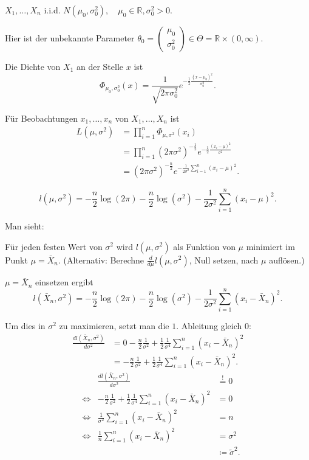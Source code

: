 \documentclass{tstextbook}
\newcommand{\R}{\mathbb R}
\begin{document}
\begin{example}
	$ X_1,\ldots,X_n $ i.i.d. $ N(\mu_0,\sigma_0^2), \quad \mu_0 \in \R, \sigma_0^2 > 0 $. 
	
	Hier ist der unbekannte Parameter $ \theta_0 = \begin{pmatrix}
		\mu_0 \\ \sigma_0^2
	\end{pmatrix} \in \Theta = \R \times (0,\infty) $.
	
	Die Dichte von $ X_1 $ an der Stelle $ x $ ist 
	\[
	\Phi_{\mu_0,\sigma_0^2}(x) = \frac{1}{\sqrt{2\pi\sigma_0^2}} e^{-\frac{1}{2}\frac{(x-\mu_0)^2}{\sigma_0^2}}.
	\]
	
	Für Beobachtungen $ x_1, \ldots, x_n $ von $ X_1,\ldots,X_n $ ist 
	\[
	\begin{aligned}
		L\left(\mu,\sigma^2\right) & = \prod_{i=1}^{n} \Phi_{\mu,\sigma^2}(x_i) \\
		& = \prod_{i=1}^{n} (2\pi\sigma^2)^{-\frac{1}{2}} e^{-\frac{1}{2}\frac{(x_i-\mu)^2}{\sigma^2}} \\
		& = (2\pi\sigma^2)^{-\frac{n}{2}} e^{-\frac{1}{2\sigma^2}\sum_{i=1}^{n}(x_i-\mu)^2}.
	\end{aligned}
	\]
	
	\[
	l\left(\mu,\sigma^2\right) = -\frac{n}{2}\log(2\pi)-\frac{n}{2}\log(\sigma^2)-\frac{1}{2\sigma^2}\sum_{i=1}^{n}(x_i-\mu)^2.
	\]
	
	Man sieht:
	
	Für jeden festen Wert von $ \sigma^2 $ wird $ l\left(\mu,\sigma^2\right) $ als Funktion von $ \mu $ minimiert im Punkt $ \mu = \bar{X}_n $. (Alternativ: Berechne $ \frac{d}{d\mu}l\left(\mu,\sigma^2\right) $, Null setzen, nach $ \mu $ auflösen.)
	
	$ \mu = \bar{X}_n $ einsetzen ergibt 
	\[
	l\left(\bar{X}_n,\sigma^2\right) = -\frac{n}{2}\log(2\pi)-\frac{n}{2}\log(\sigma^2)-\frac{1}{2\sigma^2}\sum_{i=1}^{n}(x_i-\bar{X}_n)^2.
	\]
	
	Um dies in $ \sigma^2 $ zu maximieren, setzt man die $ 1. $ Ableitung gleich $ 0 $:
	\[
	\begin{aligned}
		\frac{dl\left(\bar{X}_n,\sigma^2\right)}{d\sigma^2} & = 0-\frac{n}{2}\frac{1}{\sigma^2}+\frac{1}{2}\frac{1}{\sigma^4}\sum_{i=1}^{n}(x_i-\bar{X}_n)^2 \\
		& = -\frac{n}{2}\frac{1}{\sigma^2}+\frac{1}{2}\frac{1}{\sigma^4}\sum_{i=1}^{n}(x_i-\bar{X}_n)^2.
	\end{aligned}
	\]
	\[
	\begin{aligned}
		&& \frac{dl\left(\bar{X}_n,\sigma^2\right)}{d\sigma^2} & \overset{!}{=} 0 \\
		&\Leftrightarrow& -\frac{n}{2}\frac{1}{\sigma^2}+\frac{1}{2}\frac{1}{\sigma^4}\sum_{i=1}^{n}(x_i-\bar{X}_n)^2 & = 0 \\
		&\Leftrightarrow& \frac{1}{\sigma^2}\sum_{i=1}^{n}(x_i-\bar{X}_n)^2 & = n \\
		&\Leftrightarrow& \frac{1}{n}\sum_{i=1}^{n}(x_i-\bar{X}_n)^2 & = \sigma^2 \\
		& & & \coloneqq \tilde{\sigma}^2.
	\end{aligned}
	\]
	

\end{example}
\end{document}
